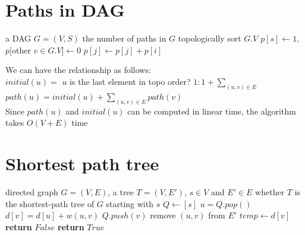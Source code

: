 \documentclass[a4paper]{article}
\begin{document}
\begin{spacing}{1.3}
\section*{Paths in DAG}
\begin{algorithmic}[1]
\Require a DAG $G=(V,S)$
\Ensure the number of paths in $G$
\State topologically sort $G.V$
\State $p[s]\gets 1$, $p[$other $v\in G.V]\gets 0$
\State $p[j]\gets p[j]+p[i]$
\EndFor
\EndFor
\EndProcedure
\end{algorithmic}
We can have the relationship as follows:
\\$initial(u)=$ $u$ is the last element in topo order? $1:1+\sum\limits_{(u,v)\in E}$ 
\\$path(u)=initial(u)+\sum\limits_{(u,v)\in E}path(v)$ 
\\Since $path(u)$ and $initial(u)$ can be computed in linear time, the algorithm takes $O(V+E)$ time

\section*{Shortest path tree}
\begin{algorithmic}[1]
\Require directed graph $G=(V,E)$, a tree $T=(V,E')$, $s\in V$ and $E'\in E$
\Ensure whether $T$ is the shortest-path tree of $G$ starting with $s$
\State $Q\gets [s]$
\State $u=Q.pop()$
\State $d[v]=d[u]+w(u,v)$
\State $Q.push(v)$
\State remove $(u,v)$ from $E'$
\EndFor
\EndWhile
{}
\State $temp\gets d[v]$
\State {}
\State \textbf{return} $False$
\EndIf
\EndFor
\State \textbf{return} $True$
\end{algorithmic}
\end{spacing}
\end{document}
